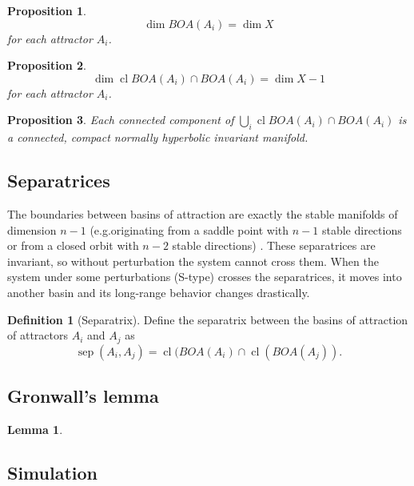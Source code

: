\documentclass{article}
\newtheorem{proposition}{Proposition}
\newtheorem{lemma}{Lemma}
\theoremstyle{definition}
\newtheorem{definition}{Definition}
\theoremstyle{remark}
\newcommand{\sep}{\operatorname{sep}}
\newcommand{\cl}{\operatorname{cl}}
\newcounter{ct}
\begin{document}

\begin{proposition}
\[\dim BOA(A_i) = \dim X\] for each attractor $A_i$.
\end{proposition}
\begin{proposition}
\[\dim\cl BOA(A_i) \cap BOA(A_i) = \dim X - 1 \] for each attractor $A_i$.
\end{proposition}



\begin{proposition}
Each connected component of $\bigcup_i\cl BOA(A_i) \cap BOA(A_i) $ is a connected, compact normally hyperbolic invariant manifold. %
\end{proposition}


\subsection{Separatrices}
The boundaries between basins of attraction are exactly the stable manifolds of dimension $n-1$ (e.g.originating from a saddle point with $n-1$ stable directions 
or from a closed orbit with $n-2$ stable directions) \citep{gruemm1975stable}.
These separatrices are invariant, so without  perturbation the system cannot cross them.
When the system under some perturbations (S-type) crosses the separatrices, it moves into another basin and its long-range behavior changes drastically.

\begin{definition}[Separatrix]\label{def:separatrix}
Define the separatrix between the basins of attraction of attractors $A_i$ and $A_j$ as 
\begin{equation}
\sep(A_i,A_j) = \cl(BOA(A_i)\cap \cl(BOA(A_j)).
\end{equation}
\end{definition}


\subsection{Gronwall's lemma}\label{sec:gronwall}
\begin{lemma}\label{lemma:gronwall}

\end{lemma}


\subsection{Simulation}\label{sec:simulation}
\citep{sontag1992neural}
\end{document}
